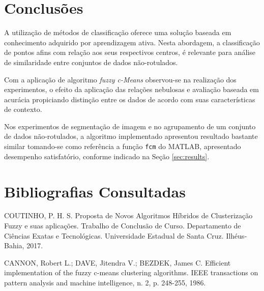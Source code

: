 \documentclass[12pt,a4paper]{article}
\numberwithin{equation}{section}
\begin{document}
\newpage
\section{Conclusões}

A utilização de métodos de classificação oferece uma solução baseada em conhecimento adquirido por aprendizagem ativa. Nesta abordagem, a classificação de pontos afins com relação aos seus respectivos centros, é relevante para análise de similaridade entre conjuntos de dados não-rotulados. 

Com a aplicação de algoritmo \textit{fuzzy c-Means} observou-se na realização dos experimentos, o efeito da aplicação das relações nebulosas e avaliação baseada em acurácia propiciando distinção entre os dados de acordo com suas características de contexto.

Nos experimentos de segmentação de imagem e no agrupamento de um conjunto de dados não-rotulados, a algoritmo implementado apresentou resultado bastante similar tomando-se como referência a função \texttt{fcm} do MATLAB\textcopyright, apresentado desempenho satisfatório, conforme indicado na Seção \ref{sec:results}.

\newpage

\section*{Bibliografias Consultadas}
%

\noindent [1] COUTINHO, P. H. S. Proposta de Novos Algoritmos Híbridos de Clusterização Fuzzy e suas aplicações. Trabalho de Conclusão de Curso. Departamento de Ciências Exatas e Tecnológicas. Universidade Estadual de Santa Cruz. Ilhéus-Bahia, 2017.

\noindent [2] CANNON, Robert L.; DAVE, Jitendra V.; BEZDEK, James C. Efficient implementation of the fuzzy c-means clustering algorithms. IEEE transactions on pattern analysis and machine intelligence, n. 2, p. 248-255, 1986.
\end{document}
